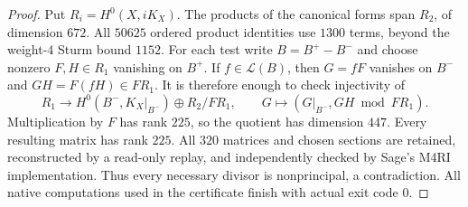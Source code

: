 \begin{proof}
Put $R_i=H^0(X,iK_X)$. The products of the canonical forms span $R_2$, of dimension $672$. All $50625$ ordered product identities use $1300$ terms, beyond the weight-$4$ Sturm bound $1152$. For each test write $B=B^+-B^-$ and choose nonzero $F,H\in R_1$ vanishing on $B^+$. If $f\in\mathcal L(B)$, then $G=fF$ vanishes on $B^-$ and $GH=F(fH)\in FR_1$. It is therefore enough to check injectivity of
\[
 R_1\longrightarrow H^0(B^-,K_X|_{B^-})\oplus R_2/FR_1,
 \qquad G\longmapsto(G|_{B^-},GH\bmod FR_1).
\]
Multiplication by $F$ has rank $225$, so the quotient has dimension $447$. Every resulting matrix has rank $225$. All $320$ matrices and chosen sections are retained, reconstructed by a read-only replay, and independently checked by Sage's M4RI implementation. Thus every necessary divisor is nonprincipal, a contradiction. All native computations used in the certificate finish with actual exit code $0$.
\end{proof}
